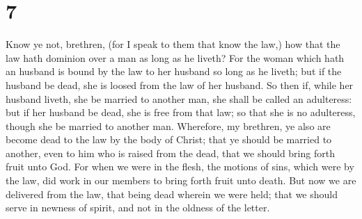 \hypertarget{section-6}{%
\section{7}\label{section-6}}

 Know ye not, brethren, (for I speak to them that know the
law,) how that the law hath dominion over a man as long as he liveth?
 For the woman which hath an husband is bound by the law to
her husband so long as he liveth; but if the husband be dead, she is
loosed from the law of her husband.  So then if, while her
husband liveth, she be married to another man, she shall be called an
adulteress: but if her husband be dead, she is free from that law; so
that she is no adulteress, though she be married to another man.
 Wherefore, my brethren, ye also are become dead to the law
by the body of Christ; that ye should be married to another, even to him
who is raised from the dead, that we should bring forth fruit unto God.
 For when we were in the flesh, the motions of sins, which
were by the law, did work in our members to bring forth fruit unto
death.  But now we are delivered from the law, that being
dead wherein we were held; that we should serve in newness of spirit,
and not in the oldness of the letter.

